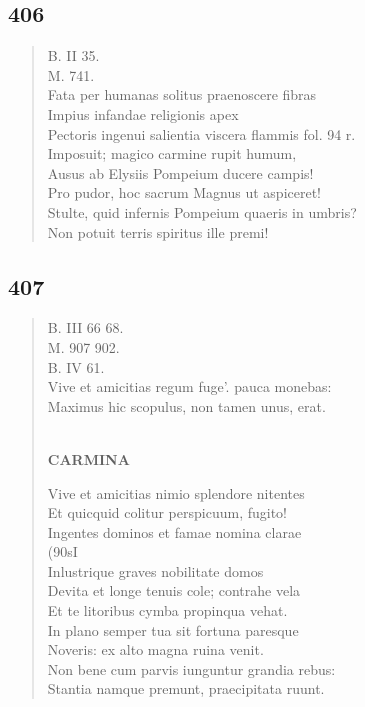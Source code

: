 \documentclass[11pt, a4paper]{report}
\begin{document}
            \subsection*{406}
      \begin{verse}
      B. II 35. \\ M. 741. \\ Fata per humanas solitus praenoscere fibras \\ Impius infandae religionis apex \\ Pectoris ingenui salientia viscera flammis fol. 94 r. \\ Imposuit; magico carmine rupit humum, \\ Ausus ab Elysiis Pompeium ducere campis! \\ Pro pudor, hoc sacrum Magnus ut aspiceret! \\ Stulte, quid infernis Pompeium quaeris in umbris? \\ Non potuit terris spiritus ille premi! \\ 
      \end{verse}
  
            \subsection*{407}
      \begin{verse}
      B. III 66 68. \\ M. 907 902. \\ B. IV 61. \\ Vive et amicitias regum fuge’. pauca monebas: \\ Maximus hic scopulus, non tamen unus, erat. \\ 
        ﻿\pagebreak 
     \marginpar{[316]} \begin{center} \textbf{CARMINA} \end{center}Vive et amicitias nimio splendore nitentes \\ Et quicquid colitur perspicuum, fugito! \\ Ingentes dominos et famae nomina clarae \\ (90sI \\ Inlustrique graves nobilitate domos \\ Devita et longe tenuis cole; contrahe vela \\ Et te litoribus cymba propinqua vehat. \\ In plano semper tua sit fortuna paresque \\ Noveris: ex alto magna ruina venit. \\ Non bene cum parvis iunguntur grandia rebus: \\ Stantia namque premunt, praecipitata ruunt. \\ 
      \end{verse}
  
\end{document}
